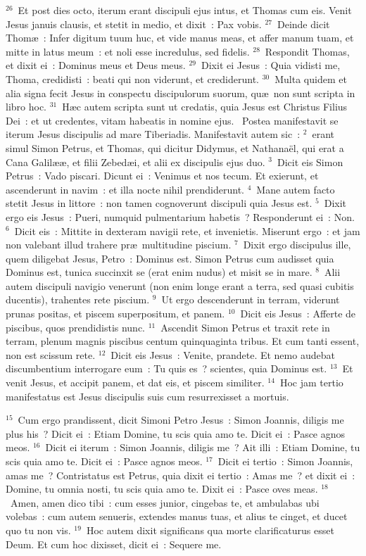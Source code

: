 ${}^{26}$~Et post dies octo, iterum erant discipuli ejus intus, et Thomas cum eis. Venit Jesus januis clausis, et stetit in medio, et dixit~: Pax vobis.
${}^{27}$~Deinde dicit Thom\ae~: Infer digitum tuum huc, et vide manus meas, et affer manum tuam, et mitte in latus meum~: et noli esse incredulus, sed fidelis.
${}^{28}$~Respondit Thomas, et dixit ei~: Dominus meus et Deus meus.
${}^{29}$~Dixit ei Jesus~: Quia vidisti me, Thoma, credidisti~: beati qui non viderunt, et crediderunt.
${}^{30}$~Multa quidem et alia signa fecit Jesus in conspectu discipulorum suorum, qu\ae\ non sunt scripta in libro hoc.
${}^{31}$~H\ae c autem scripta sunt ut credatis, quia Jesus est Christus Filius Dei~: et ut credentes, vitam habeatis in nomine ejus.
~Postea manifestavit se iterum Jesus discipulis ad mare Tiberiadis. Manifestavit autem sic~:
${}^{2}$~erant simul Simon Petrus, et Thomas, qui dicitur Didymus, et Nathana\"el, qui erat a Cana Galil\ae \ae , et filii Zebed\ae i, et alii ex discipulis ejus duo.
${}^{3}$~Dicit eis Simon Petrus~: Vado piscari. Dicunt ei~: Venimus et nos tecum. Et exierunt, et ascenderunt in navim~: et illa nocte nihil prendiderunt.
${}^{4}$~Mane autem facto stetit Jesus in littore~: non tamen cognoverunt discipuli quia Jesus est.
${}^{5}$~Dixit ergo eis Jesus~: Pueri, numquid pulmentarium habetis~? Responderunt ei~: Non.
${}^{6}$~Dicit eis~: Mittite in dexteram navigii rete, et invenietis. Miserunt ergo~: et jam non valebant illud trahere pr\ae\ multitudine piscium.
${}^{7}$~Dixit ergo discipulus ille, quem diligebat Jesus, Petro~: Dominus est. Simon Petrus cum audisset quia Dominus est, tunica succinxit se (erat enim nudus) et misit se in mare.
${}^{8}$~Alii autem discipuli navigio venerunt (non enim longe erant a terra, sed quasi cubitis ducentis), trahentes rete piscium.
${}^{9}$~Ut ergo descenderunt in terram, viderunt prunas positas, et piscem superpositum, et panem.
${}^{10}$~Dicit eis Jesus~: Afferte de piscibus, quos prendidistis nunc.
${}^{11}$~Ascendit Simon Petrus et traxit rete in terram, plenum magnis piscibus centum quinquaginta tribus. Et cum tanti essent, non est scissum rete.
${}^{12}$~Dicit eis Jesus~: Venite, prandete. Et nemo audebat discumbentium interrogare eum~: Tu quis es~? scientes, quia Dominus est.
${}^{13}$~Et venit Jesus, et accipit panem, et dat eis, et piscem similiter.
${}^{14}$~Hoc jam tertio manifestatus est Jesus discipulis suis cum resurrexisset a mortuis.


${}^{15}$~Cum ergo prandissent, dicit Simoni Petro Jesus~: Simon Joannis, diligis me plus his~? Dicit ei~: Etiam Domine, tu scis quia amo te. Dicit ei~: Pasce agnos meos.
${}^{16}$~Dicit ei iterum~: Simon Joannis, diligis me~? Ait illi~: Etiam Domine, tu scis quia amo te. Dicit ei~: Pasce agnos meos.
${}^{17}$~Dicit ei tertio~: Simon Joannis, amas me~? Contristatus est Petrus, quia dixit ei tertio~: Amas me~? et dixit ei~: Domine, tu omnia nosti, tu scis quia amo te. Dixit ei~: Pasce oves meas.
${}^{18}$~Amen, amen dico tibi~: cum esses junior, cingebas te, et ambulabas ubi volebas~: cum autem senueris, extendes manus tuas, et alius te cinget, et ducet quo tu non vis.
${}^{19}$~Hoc autem dixit significans qua morte clarificaturus esset Deum. Et cum hoc dixisset, dicit ei~: Sequere me.


